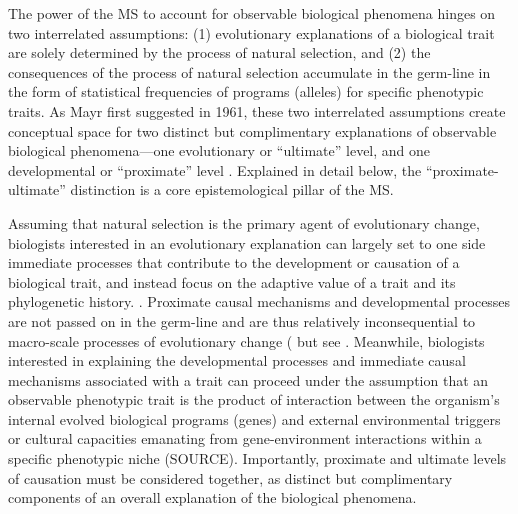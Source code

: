 The power of the MS to account for observable biological phenomena hinges on two interrelated assumptions: (1) evolutionary explanations of a biological trait are solely determined by the process of natural selection, and (2) the consequences of the process of natural selection accumulate in the germ-line in the form of statistical frequencies of programs (alleles) for specific phenotypic traits.  As Mayr first suggested in 1961, these two interrelated assumptions create conceptual space for two distinct but complimentary explanations of observable biological phenomena---one evolutionary or ``ultimate'' level, and one developmental or ``proximate'' level \citep{Mayr1961}.  Explained in detail below, the ``proximate-ultimate'' distinction is a core epistemological pillar of the MS.

Assuming that natural selection is the primary agent of evolutionary change, biologists interested in an evolutionary explanation can largely set to one side immediate processes that contribute to the development or causation of a biological trait, and instead focus on the adaptive value of a trait and its phylogenetic history. \citep{Mayr1961,Tinbergen1963}.  Proximate causal mechanisms and developmental processes are not passed on in the germ-line and are thus relatively inconsequential to macro-scale processes of evolutionary change (\citep{Dawkins1982,Grafen1991,Svensson2017} but see \citep{Laland2013,Laland2015}.  Meanwhile, biologists interested in explaining the developmental processes and immediate causal mechanisms associated with a trait can proceed under the assumption that an observable phenotypic trait is the product of interaction between the organism's internal evolved biological programs (genes) and external environmental triggers or cultural capacities emanating from gene-environment interactions within a specific phenotypic niche (SOURCE).  Importantly, proximate and ultimate levels of causation must be considered together, as distinct but complimentary components of an overall explanation of the biological phenomena\citep{Mayr1961,Tinbergen1963,Scott-Phillips2011}.

